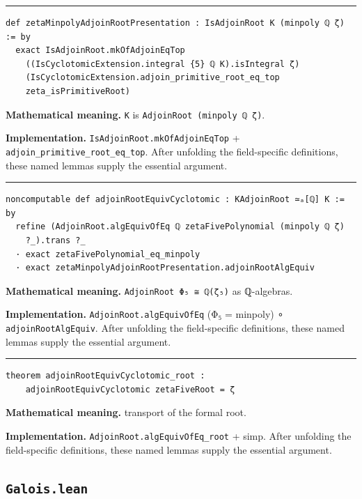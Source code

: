 \documentclass[UTF8,a4paper,11pt,fontset=fandol]{ctexart}
\theoremstyle{definition}
\newcommand{\statementsep}{\par\medskip\hrule\medskip}
\begin{document}
\statementsep
\begin{verbatim}
def zetaMinpolyAdjoinRootPresentation : IsAdjoinRoot K (minpoly ℚ ζ) := by
  exact IsAdjoinRoot.mkOfAdjoinEqTop
    ((IsCyclotomicExtension.integral {5} ℚ K).isIntegral ζ)
    (IsCyclotomicExtension.adjoin_primitive_root_eq_top
    zeta_isPrimitiveRoot)
\end{verbatim}
\noindent\textbf{Mathematical meaning.} \texttt{K} is \texttt{AdjoinRoot (minpoly ℚ ζ)}.\par
\noindent\textbf{Implementation.} \texttt{IsAdjoinRoot.\allowbreak{}mkOfAdjoinEqTop} + \texttt{adjoin\_\allowbreak{}primitive\_\allowbreak{}root\_\allowbreak{}eq\_\allowbreak{}top}. After unfolding the field-specific definitions, these named lemmas supply the essential argument.\par
\statementsep
\begin{verbatim}
noncomputable def adjoinRootEquivCyclotomic : KAdjoinRoot ≃ₐ[ℚ] K := by
  refine (AdjoinRoot.algEquivOfEq ℚ zetaFivePolynomial (minpoly ℚ ζ)
    ?_).trans ?_
  · exact zetaFivePolynomial_eq_minpoly
  · exact zetaMinpolyAdjoinRootPresentation.adjoinRootAlgEquiv
\end{verbatim}
\noindent\textbf{Mathematical meaning.} \texttt{AdjoinRoot Φ₅ ≅ ℚ(ζ₅)} as ℚ-algebras.\par
\noindent\textbf{Implementation.} \texttt{AdjoinRoot.\allowbreak{}algEquivOfEq} (Φ₅ = minpoly) ∘ \texttt{adjoinRootAlgEquiv}. After unfolding the field-specific definitions, these named lemmas supply the essential argument.\par
\statementsep
\begin{verbatim}
theorem adjoinRootEquivCyclotomic_root :
    adjoinRootEquivCyclotomic zetaFiveRoot = ζ
\end{verbatim}
\noindent\textbf{Mathematical meaning.} transport of the formal root.\par
\noindent\textbf{Implementation.} \texttt{AdjoinRoot.\allowbreak{}algEquivOfEq\_\allowbreak{}root} + simp. After unfolding the field-specific definitions, these named lemmas supply the essential argument.\par

\subsection{\texttt{Galois.lean}}
\end{document}
